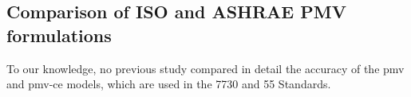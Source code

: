 %
%

\subsection{Comparison of ISO and ASHRAE PMV formulations}\label{subsec:comparision-of-pmv-formulations}
To our knowledge, no previous study compared in detail the accuracy of the \ac{pmv} and \ac{pmv-ce} models, which are used in the \gls{7730} and \gls{55} Standards.

